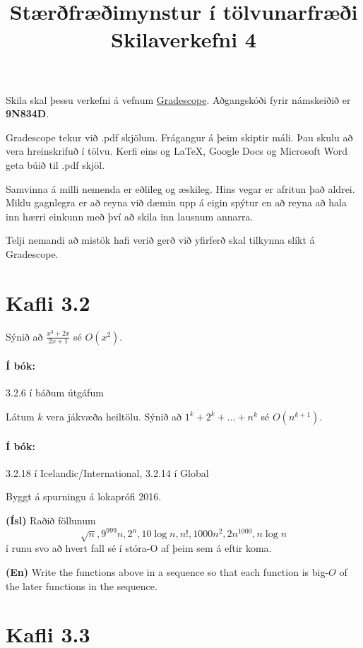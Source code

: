 \documentclass{article}
\title{Stærðfræðimynstur í tölvunarfræði \\ Skilaverkefni 4}
\author{}
\begin{document}
\maketitle

Skila skal þessu verkefni á vefnum \href{https://gradescope.com/courses/9487}{Gradescope}. Aðgangskóði fyrir námskeiðið er \textbf{9N834D}.

Gradescope tekur við .pdf skjölum. Frágangur á þeim skiptir máli. Þau skulu að vera hreinskrifuð í tölvu. Kerfi eins og \LaTeX, Google Docs og Microsoft Word geta búið til .pdf skjöl.

Samvinna á milli nemenda er eðlileg og æskileg. Hins vegar er afritun það aldrei. Miklu gagnlegra er að reyna við dæmin upp á eigin spýtur en að reyna að hala inn hærri einkunn með því að skila inn lausnum annarra.

Telji nemandi að mistök hafi verið gerð við yfirferð skal tilkynna slíkt á Gradescope.

\section{Kafli 3.2}

\question

Sýnið að $\frac{x^3+2x}{2x+1}$ sé $O(x^2)$.

\paragraph{Í bók:} 3.2.6 í báðum útgáfum

\question

Látum $k$ vera jákvæða heiltölu. Sýnið að $1^k + 2^k + \ldots + n^k$ sé $O(n^{k+1})$.

\paragraph{Í bók:} 3.2.18 í Icelandic/International, 3.2.14 í Global

\question

Byggt á spurningu á lokaprófi 2016.

\textbf{(Ísl)} Raðið föllunum 
\[
    \sqrt{n}, 9^{999} n, 2^n, 10\log n, n!, 1000 n^2, 2 n^{1000}, n \log n
\]
í runu svo að hvert fall sé í stóra-O af þeim sem á eftir koma.

\textbf{(En)} Write the functions above in a sequence so that each function is big-$O$ of the later functions in the sequence.

\section{Kafli 3.3}
\end{document}
